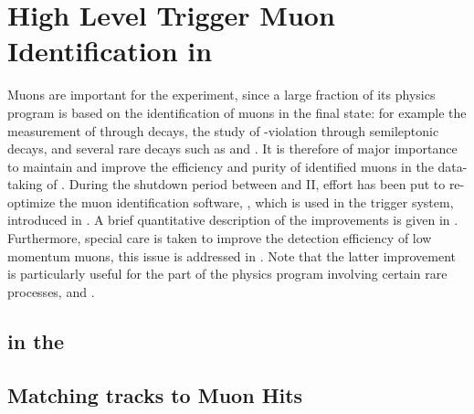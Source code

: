 \chapter{High Level Trigger Muon Identification in \runtwo}
\label{Muon_id_hlt}

Muons are important for the \lhcb experiment, since a large fraction of its physics program is based on
the identification of muons in the final state: for example the measurement of \phis through \BsJpsiPhi decays,
the study of \CP-violation through semileptonic decays, and several rare decays such as \BdKstmumu and \Bsmm.
It is therefore of major importance to maintain and improve the efficiency and purity of identified muons in
the \runtwo data-taking of \lhcb. During the shutdown period between \runone and II, effort has been put to
re-optimize the muon identification software, \muonID, which is used in the \lhcb trigger system, introduced in .
A brief quantitative description of the \muonID improvements is given in .
Furthermore, special care is taken to improve the detection efficiency of low momentum muons, this issue is
addressed in . Note that the latter improvement is particularly useful for the part
of the \lhcb physics program involving certain rare processes, \eg \Sigmapmumu \cite{LHCB-CONF-2016-013-001} and \Ksmumu \cite{LHCb-CONF-2016-012}.

\section{\hltone \muonID in the \lhc \runtwo}
\label{muid_hlt1}


\section{Matching \velo tracks to Muon Hits}
\label{mvm_algorrithm}

